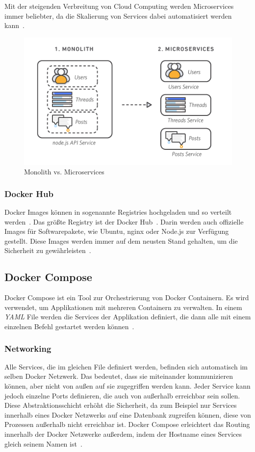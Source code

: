  Mit der steigenden Verbreitung von Cloud Computing werden Microservices immer beliebter, da die Skalierung
 von Services dabei automatisiert werden kann~\cite{microservices}.

 \begin{figure}[hbt!]
     \centering
     \includegraphics[scale=0.5]{pics/microservice}
     \caption{Monolith vs. Microservices~\cite{microservices}}
 \end{figure}

 \subsubsection{Docker Hub}
 Docker Images können in sogenannte Registries hochgeladen und so verteilt werden~\cite{docker-registry}.
 Das größte Registry ist der Docker Hub~\cite{docker-hub}.
 Darin werden auch offizielle Images für Softwarepakete, wie Ubuntu, nginx oder Node.js zur Verfügung gestellt.
 Diese Images werden immer auf dem neusten Stand gehalten, um die Sicherheit zu
 gewährleisten~\cite{docker-official-images}.

\subsection{Docker Compose}

 Docker Compose ist ein Tool zur Orchestrierung von Docker Containern.
 Es wird verwendet, um Applikationen mit mehreren Containern zu verwalten.
 In einem \textit{YAML} File werden die Services der Applikation definiert, die dann alle mit einem einzelnen
 Befehl gestartet werden können~\cite{docker-compose}.

 \subsubsection{Networking}
 Alle Services, die im gleichen File definiert werden, befinden sich automatisch im selben Docker Netzwerk.
 Das bedeutet, dass sie miteinander kommunizieren können, aber nicht von außen auf sie zugegriffen werden kann.
 Jeder Service kann jedoch einzelne Ports definieren, die auch von außerhalb erreichbar sein sollen.
 Diese Abstraktionsschicht erhöht die Sicherheit, da zum Beispiel nur Services innerhalb eines Docker Netzwerks auf eine
 Datenbank zugreifen können, diese von Prozessen außerhalb nicht erreichbar ist.
 Docker Compose erleichtert das Routing innerhalb der Docker Netzwerke außerdem, indem der Hostname eines Services
 gleich seinem Namen ist~\cite{docker-network}.
